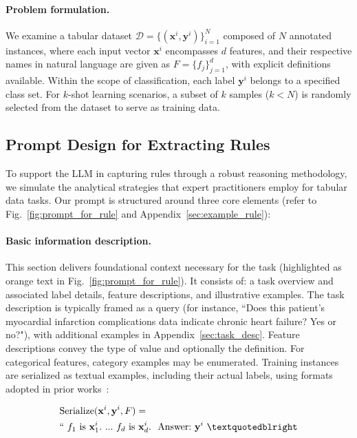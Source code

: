 \vspace*{-0.12in}
\paragraph{Problem formulation.} We examine a tabular dataset $\mathcal{D} = \{(\mathbf{x}^i, \mathbf{y}^i)\}_{i=1}^{N}$ composed of $N$ annotated instances, where each input vector $\mathbf{x}^i$ encompasses $d$ features, and their respective names in natural language are given as $F = \{f_j\}_{j=1}^{d}$, with explicit definitions available. Within the scope of classification, each label $\mathbf{y}^i$ belongs to a specified class set. For $k$-shot learning scenarios, a subset of $k$ samples ($k < N$) is randomly selected from the dataset to serve as training data.

\subsection{Prompt Design for Extracting Rules}
\label{Sec:prompt_design}
To support the LLM in capturing rules through a robust reasoning methodology, we simulate the analytical strategies that expert practitioners employ for tabular data tasks. Our prompt is structured around three core elements (refer to Fig.~\ref{fig:prompt_for_rule} and Appendix~\ref{sec:example_rule}):

\vspace*{-0.12in}
\paragraph{Basic information description.} This section delivers foundational context necessary for the task (highlighted as orange text in Fig.~\ref{fig:prompt_for_rule}). It consists of: a task overview and associated label details, feature descriptions, and illustrative examples. The task description is typically framed as a query (for instance, ``Does this patient's myocardial infarction complications data indicate chronic heart failure? Yes or no?"), with additional examples in Appendix~\ref{sec:task_desc}. Feature descriptions convey the type of value and optionally the definition. For categorical features, category examples may be enumerated. Training instances are serialized as textual examples, including their actual labels, using formats adopted in prior works~\cite{dinh2022lift,hegselmann2023tabllm}:

\begin{align}
&\text{Serialize}(\mathbf{x}^i,\mathbf{y}^i, F) = \nonumber \\ 
&``\ f_1\ \text{is}\ \mathbf{x}^i_1.\ ... \ f_d\  \text{is}\  \mathbf{x}^i_d.\ \ \text{Answer:}\  \mathbf{y}^i\ ”
\end{align}

